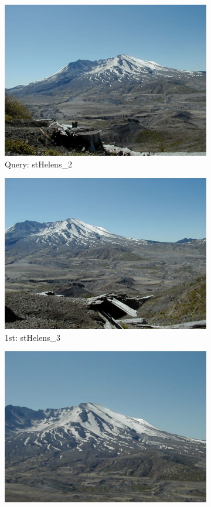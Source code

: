 \documentclass[10pt, a4paper]{article}
\begin{document}
\begin{itemize}
\begin{figure}[H]
	\centering
	\begin{subfigure}{0.25\textwidth}
	  \centering
	  \includegraphics[width=0.9\linewidth]{../input/stHelens_2.jpg}
	  \caption{Query: stHelens\_2}
	\end{subfigure}%
	\begin{subfigure}{0.25\textwidth}
	  \centering
	  \includegraphics[width=0.9\linewidth]{../input/stHelens_3.jpg}
	  \caption{1st: stHelens\_3}
	\end{subfigure}%
	\begin{subfigure}{0.25\textwidth}
        \centering
        \includegraphics[width=0.9\linewidth]{../input/stHelens_5.jpg}

\end{subfigure}
\end{figure}
\end{itemize}
\end{document}
